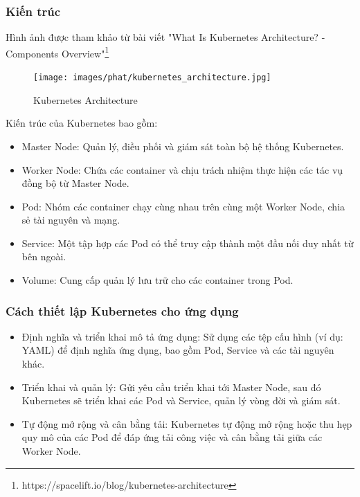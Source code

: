 \subsubsection{Kiến trúc}
\noindent Hình ảnh được tham khảo từ bài viết "What Is Kubernetes Architecture? - Components Overview"\footnote{https://spacelift.io/blog/kubernetes-architecture}
 \begin{figure}[H]
    \begin{center}
    \texttt{[image: images/phat/kubernetes\_architecture.jpg]}
    \vspace*{7mm}
    \caption{Kubernetes Architecture }
    \end{center}
    \label{}
\end{figure}
\noindent Kiến trúc của Kubernetes bao gồm:
\begin{itemize}
    \item Master Node: Quản lý, điều phối và giám sát toàn bộ hệ thống Kubernetes.
    \item Worker Node: Chứa các container và chịu trách nhiệm thực hiện các tác vụ đồng bộ từ Master Node.
    \item Pod: Nhóm các container chạy cùng nhau trên cùng một Worker Node, chia sẻ tài nguyên và mạng.
    \item Service: Một tập hợp các Pod có thể truy cập thành một đầu nối duy nhất từ bên ngoài.
    \item Volume: Cung cấp quản lý lưu trữ cho các container trong Pod.
\end{itemize}
\subsubsection{Cách thiết lập Kubernetes cho ứng dụng}
\begin{itemize}
    \item Định nghĩa và triển khai mô tả ứng dụng: Sử dụng các tệp cấu hình (ví dụ: YAML) để định nghĩa ứng dụng, bao gồm Pod, Service và các tài nguyên khác.
    \item Triển khai và quản lý: Gửi yêu cầu triển khai tới Master Node, sau đó Kubernetes sẽ triển khai các Pod và Service, quản lý vòng đời và giám sát.
    \item Tự động mở rộng và cân bằng tải: Kubernetes tự động mở rộng hoặc thu hẹp quy mô của các Pod để đáp ứng tải công việc và cân bằng tải giữa các Worker Node.
\end{itemize}
